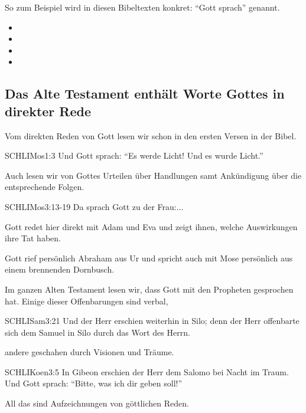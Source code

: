So zum Beispiel wird in diesen Bibeltexten konkret: \enquote{Gott sprach} genannt.\\
\begin{itemize}
  \item {}
  \item {}
  \item {}
  \item {}
\end{itemize}

\subsection{Das Alte Testament enthält Worte Gottes in direkter Rede}
Vom direkten Reden von Gott lesen wir schon in den ersten Versen in der Bibel.
\begin{bibelquote}{SCHL}{IMos}{1:3}
  Und Gott sprach: \enquote{Es werde Licht! Und es wurde Licht.}
\end{bibelquote}
Auch lesen wir von Gottes Urteilen über Handlungen samt Ankündigung über die entsprechende Folgen.
\begin{bibelquote}{SCHL}{IMos}{3:13-19}
  Da sprach Gott zu der Frau:...
\end{bibelquote}
Gott redet hier direkt mit Adam und Eva und zeigt ihnen, welche Auswirkungen ihre Tat haben.

Gott rief persönlich Abraham aus Ur und spricht auch mit Mose persönlich aus einem brennenden Dornbusch.

Im ganzen Alten Testament lesen wir, dass Gott mit den Propheten gesprochen hat. Einige dieser Offenbarungen sind verbal,
\begin{bibelquote}{SCHL}{ISam}{3:21}
  Und der Herr erschien weiterhin in Silo; denn der Herr offenbarte sich dem Samuel in Silo durch das Wort des Herrn.
\end{bibelquote}
andere geschahen durch Visionen und Träume.
\begin{bibelquote}{SCHL}{IKoen}{3:5}
  In Gibeon erschien der Herr dem Salomo bei Nacht im Traum. Und Gott sprach: \enquote{Bitte, was ich dir geben soll!}
\end{bibelquote}
All das sind Aufzeichnungen von göttlichen Reden.
